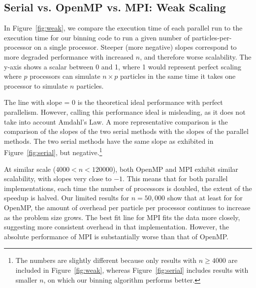 \documentclass{article}
\begin{document}
\subsection{Serial vs. OpenMP vs. MPI: Weak Scaling}
In Figure~\ref{fig:weak}, we compare the execution time of each parallel run to
the execution time for our binning code to run a given number of
particles-per-processor on a single processor. Steeper (more negative) slopes
correspond to more degraded performance with increased $n$, and therefore worse
scalability. The y-axis shows a scalar between 0 and 1, where 1 would represent
perfect scaling where $p$ processors can simulate $n \times p$ particles in the
same time it takes one processor to simulate $n$ particles.

The line with slope = 0 is the theoretical ideal performance with perfect
parallelism. However, calling this performance ideal is misleading, as it does
not take into account Amdahl's Law. A more representative comparison is the
comparison of the slopes of the two serial methods with the slopes of the
parallel methods. The two serial methods have the same slope as exhibited in
Figure~\ref{fig:serial}, but negative.\footnote{The numbers are slightly
  different because only results with $n \ge 4000$ are included in
  Figure~\ref{fig:weak}, whereas Figure~\ref{fig:serial} includes results
with smaller $n$, on which our binning algorithm performs better.}

At similar scale ($4000 < n < 120000$), both OpenMP and MPI exhibit similar
scalability, with slopes very close to $-1$. This means that for both
parallel implementations, each time the number of processors is
doubled, the extent of the speedup is halved. Our limited results for $n=50,000$
show that at least for for OpenMP, the amount of overhead per particle
per processor continues to increase as the problem size grows. The best fit line
for MPI fits the data more closely, suggesting more consistent overhead in that
implementation. However, the absolute performance of MPI is substantially worse
than that of OpenMP.
\end{document}
